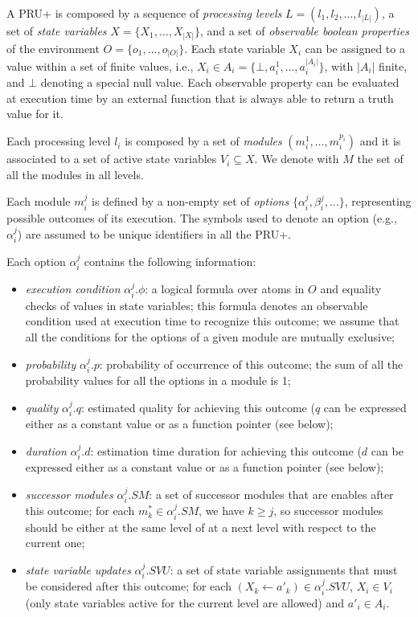 A PRU+ is composed by a sequence of \emph{processing levels} $L = ( l_1, l_2, \ldots, l_{|L|})$, a set of \emph{state variables} $X = \{ X_1, \ldots, X_{|X|} \}$, and a set of \emph{observable boolean properties} of the environment $O = \{ o_1, \ldots, o_{|O|} \}$.
Each state variable $X_i$ can be assigned to a value within a set of finite values, i.e., $X_i \in A_i = \{ \bot , a_i^1, \ldots, a_i^{|A_i|} \}$, with $|A_i|$ finite, and $\bot$ denoting a special null value. Each observable property can be evaluated at execution time by an external function that is always able to return a truth value for it.

Each processing level $l_i$ is composed by a set of \emph{modules} $( m_i^1, \ldots, m_i^{p_i} )$ and it is associated to a set of active state variables $V_i \subseteq X$.
We denote with $M$ the set of all the modules in all levels.

Each module $m_i^j$ is defined by a non-empty set of \emph{options} $\{ \alpha_i^j, \beta_i^j, \ldots \}$, representing possible outcomes of its execution. The symbols used to denote an option (e.g., $\alpha_i^j$) are assumed to be unique identifiers in all the PRU+.

Each option $\alpha_i^j$ contains the following information:
\begin{itemize}
\item \emph{execution condition} $\alpha_i^j.\phi$: a logical formula over atoms in $O$ and equality checks of values in state variables; this formula denotes an observable condition used at execution time to recognize this outcome; we assume that all the conditions for the options of a given module are mutually exclusive;
\item \emph{probability} $\alpha_i^j.p$: probability of occurrence of this outcome; the sum of all the probability values for all the options in a module is 1;
\item \emph{quality} $\alpha_i^j.q$: estimated quality for achieving this outcome ($q$ can be expressed either as a constant value or as a function pointer (see below);
\item \emph{duration} $\alpha_i^j.d$: estimation time duration for achieving this outcome ($d$ can be expressed either as a constant value or as a function pointer (see below);
\item \emph{successor modules} $\alpha_i^j.SM$: a set of successor modules that are enables after this outcome; for each $m_k^* \in \alpha_i^j.SM$, we have $k \geq j$, so successor modules should be either at the same level of at a next level with respect to the current one;
\item \emph{state variable updates} $\alpha_i^j.SVU$: a set of state variable assignments that must be considered after this outcome; for each $(X_k \leftarrow a'_k) \in \alpha_i^j.SVU$, $X_i \in V_i$ (only state variables active for the current level are allowed) and  $a'_i \in A_i$.
\end{itemize}

